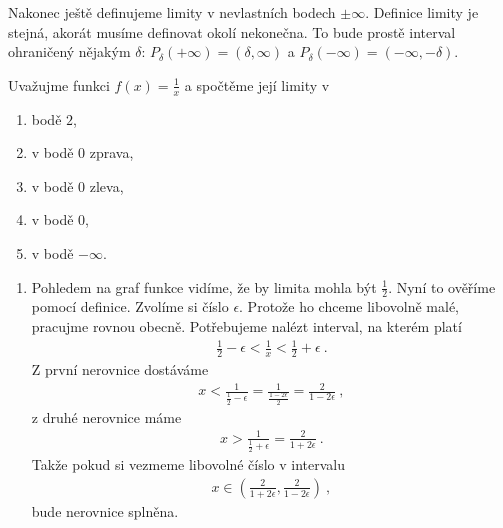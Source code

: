 Nakonec ještě definujeme limity v nevlastních bodech $\pm \infty$. Definice limity je stejná, akorát musíme definovat okolí nekonečna. To bude prostě interval ohraničený nějakým  $\delta$: $P_\delta(+\infty) = (\delta, \infty)$ a $P_\delta(-\infty) = (-\infty, -\delta)$.

\begin{example}
    Uvažujme funkci $f(x) = \frac{1}{x}$ a spočtěme její limity v \begin{enumerate}[label=(\roman*)]
        \item bodě $2$,
        \item v bodě $0$ zprava,
        \item v bodě $0$ zleva,
        \item v bodě $0$,
        \item v bodě $-\infty$.
    \end{enumerate}

    \begin{enumerate}[label=(\roman*)]
        \item Pohledem na graf funkce vidíme, že by limita mohla být $\frac{1}{2}$. Nyní to ověříme pomocí definice. Zvolíme si číslo $\epsilon$. Protože ho chceme libovolně malé, pracujme rovnou obecně. Potřebujeme nalézt interval, na kterém platí
        \begin{align}
             \frac{1}{2} - \epsilon < \frac{1}{x} < \frac{1}{2} + \epsilon \:.
        \end{align}
        Z první nerovnice dostáváme
        \begin{align}
            x < \frac{1}{\frac{1}{2} - \epsilon} = \frac{1}{\frac{1 - 2 \epsilon}{2}} = \frac{2}{1 - 2 \epsilon}\:,
        \end{align}
        z druhé nerovnice máme
        \begin{align}
            x > \frac{1}{\frac{1}{2} + \epsilon} = \frac{2}{1 + 2 \epsilon}\:.
        \end{align}
        Takže pokud si vezmeme libovolné číslo v intervalu
        \begin{align}
            x \in \left( \frac{2}{1 + 2 \epsilon}, \frac{2}{1 - 2 \epsilon} \right) \:,
        \end{align}
        bude nerovnice splněna.


\end{enumerate}
\end{example}
